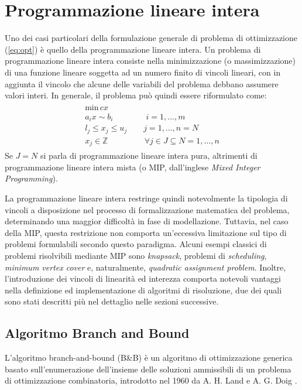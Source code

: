 \section{Programmazione lineare intera}
Uno dei casi particolari della formulazione generale di problema di ottimizzazione (\ref{eq:opt}) è quello della programmazione lineare intera.
Un problema di programmazione lineare intera consiste nella minimizzazione (o massimizzazione) di una funzione lineare soggetta ad un 
numero finito di vincoli lineari, con in aggiunta il vincolo che alcune delle variabili del problema debbano assumere valori interi. 
In generale, il problema può quindi essere riformulato come: 
\begin{align}
    \label{eq:mip}
	\begin{array}{l}
      \text{min} \, cx\\
      a_i x \sim b_i \qquad\qquad i=1,...,m \\
      l_j \leq x_j \leq u_j \qquad j=1,...,n =N \\
      x_j \in \mathbb{Z}  \;\,\qquad\qquad \forall j \in J \subseteq N = {1,...,n}	
	\end{array}
\end{align}
\indent
Se $J=N$ si parla di programmazione lineare intera pura, altrimenti di programmazione lineare intera mista (o MIP, dall'inglese 
\textit{Mixed Integer Programming}).

La programmazione lineare intera restringe quindi notevolmente la tipologia di vincoli a disposizione nel
processo di formalizzazione matematica del problema, determinando una maggior difficoltà in fase di modellazione.
Tuttavia, nel caso della MIP, questa restrizione non comporta un'eccessiva limitazione sul tipo di 
problemi formulabili secondo questo paradigma. Alcuni esempi classici di problemi risolvibili mediante MIP sono \textit{knapsack}, problemi di 
\textit{scheduling}, \textit{minimum vertex cover} e, naturalmente, \textit{quadratic assignment problem}.
Inoltre, l'introduzione dei vincoli di linearità ed interezza comporta notevoli vantaggi nella definizione ed
implementazione di algoritmi di risoluzione, due dei quali sono stati descritti più nel dettaglio nelle sezioni successive.

\subsection{Algoritmo Branch and Bound}
L'algoritmo branch-and-bound (B\&B) è un algoritmo di ottimizzazione generica basato sull'enumerazione dell'insieme delle soluzioni
ammissibili di un problema di ottimizzazione combinatoria, introdotto nel 1960 da A. H. Land e A. G. Doig \cite{10.2307/1910129}. 

